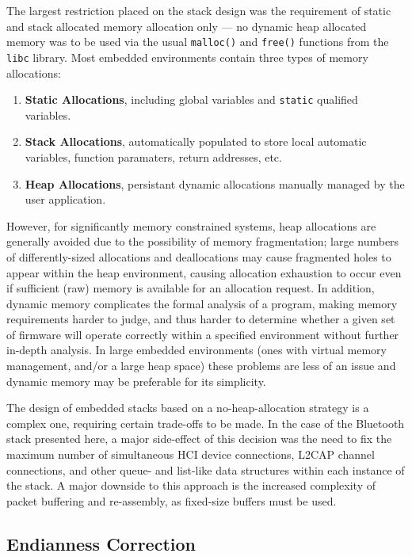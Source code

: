 The largest restriction placed on the stack design was the requirement of static and stack allocated memory allocation only --- no dynamic heap allocated memory was to be used via the usual \lstinline{malloc()} and \lstinline{free()} functions from the \texttt{libc} library. Most embedded environments contain three types of memory allocations:

\begin{enumerate}
	\item \textbf{Static Allocations}, including global variables and \lstinline{static} qualified variables.
	\item \textbf{Stack Allocations}, automatically populated to store local automatic variables, function paramaters, return addresses, etc.
	\item \textbf{Heap Allocations}, persistant dynamic allocations manually managed by the user application.
\end{enumerate}

However, for significantly memory constrained systems, heap allocations are generally avoided due to the possibility of memory fragmentation; large numbers of differently-sized allocations and deallocations may cause fragmented holes to appear within the heap environment, causing allocation exhaustion to occur even if sufficient (raw) memory is available for an allocation request. In addition, dynamic memory complicates the formal analysis of a program, making memory requirements harder to judge, and thus harder to determine whether a given set of firmware will operate correctly within a specified environment without further in-depth analysis. In large embedded environments (ones with virtual memory management, and/or a large heap space) these problems are less of an issue and dynamic memory may be preferable for its simplicity.

The design of embedded stacks based on a no-heap-allocation strategy is a complex one, requiring certain trade-offs to be made. In the case of the Bluetooth stack presented here, a major side-effect of this decision was the need to fix the maximum number of simultaneous HCI device connections, L2CAP channel connections, and other queue- and list-like data structures within each instance of the stack. A major downside to this approach is the increased complexity of packet buffering and re-assembly, as fixed-size buffers must be used.

\FloatBarrier
\subsection{Endianness Correction}

